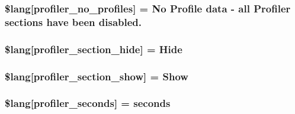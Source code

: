 \subsubsection[{\$lang}]{\setlength{\rightskip}{0pt plus 5cm}\$lang\mbox{[}\textquotesingle{}profiler\+\_\+no\+\_\+profiles\textquotesingle{}\mbox{]} = \textquotesingle{}No Profile data -\/ {\bf all} Profiler sections have been disabled.\textquotesingle{}}\label{system_2language_2english_2profiler__lang_8php_aabea841eed12fa8271f13656fa7d5457}
\hypertarget{system_2language_2english_2profiler__lang_8php_a137158ebe1d58bd53bbbb4594f2bc0ed}{}
\subsubsection[{\$lang}]{\setlength{\rightskip}{0pt plus 5cm}\$lang\mbox{[}\textquotesingle{}profiler\+\_\+section\+\_\+hide\textquotesingle{}\mbox{]} = \textquotesingle{}Hide\textquotesingle{}}\label{system_2language_2english_2profiler__lang_8php_a137158ebe1d58bd53bbbb4594f2bc0ed}
\hypertarget{system_2language_2english_2profiler__lang_8php_a3e3b1984f57780efbdaf6d01dac31f3c}{}
\subsubsection[{\$lang}]{\setlength{\rightskip}{0pt plus 5cm}\$lang\mbox{[}\textquotesingle{}profiler\+\_\+section\+\_\+show\textquotesingle{}\mbox{]} = \textquotesingle{}Show\textquotesingle{}}\label{system_2language_2english_2profiler__lang_8php_a3e3b1984f57780efbdaf6d01dac31f3c}
\hypertarget{system_2language_2english_2profiler__lang_8php_a6d6060d6ca0da3c1e6d4168914d7e362}{}
\subsubsection[{\$lang}]{\setlength{\rightskip}{0pt plus 5cm}\$lang\mbox{[}\textquotesingle{}profiler\+\_\+seconds\textquotesingle{}\mbox{]} = \textquotesingle{}seconds\textquotesingle{}}\label{system_2language_2english_2profiler__lang_8php_a6d6060d6ca0da3c1e6d4168914d7e362}
